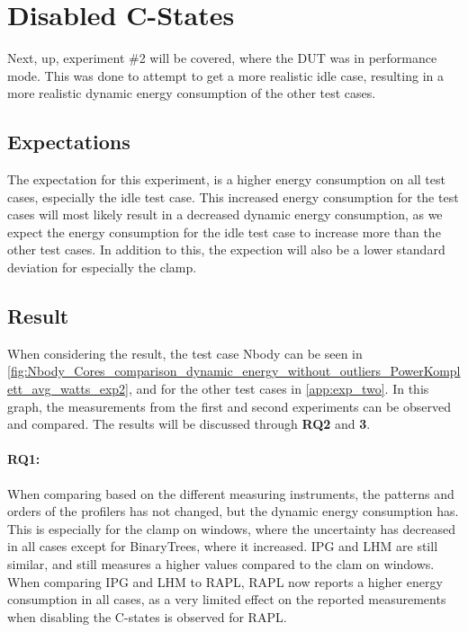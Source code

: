 \section{Disabled C-States}\label{sec:disable_c_states_exp}

Next, up, experiment \#2 will be covered, where the DUT was in performance mode. This was done to attempt to get a more realistic idle case, resulting in a more realistic dynamic energy consumption of the other test cases.

\subsection{Expectations} 

The expectation for this experiment, is a higher energy consumption on all test cases, especially the idle test case. This increased energy consumption for the test cases will most likely result in a decreased dynamic energy consumption, as we expect the energy consumption for the idle test case to increase more than the other test cases. In addition to this, the expection will also be a lower standard deviation for especially the clamp.

\subsection{Result} 
When considering the result, the test case Nbody can be seen in \cref{fig:Nbody_Cores_comparison_dynamic_energy_without_outliers_PowerKomplett_avg_watts_exp2}, and for the other test cases in \cref{app:exp_two}. In this graph, the measurements from the first and second experiments can be observed and compared. The results will be discussed through \textbf{RQ2} and \textbf{3}.

\paragraph*{RQ1:} When comparing based on the different measuring instruments, the patterns and orders of the profilers has not changed, but the dynamic energy consumption has. This is especially for the clamp on windows, where the uncertainty has decreased in all cases except for BinaryTrees, where it increased. IPG and LHM are still similar, and still measures a higher values compared to the clam on windows. When comparing IPG and LHM to RAPL, RAPL now reports a higher energy consumption in all cases, as a very limited effect on the reported measurements when disabling the C-states is observed for RAPL.


